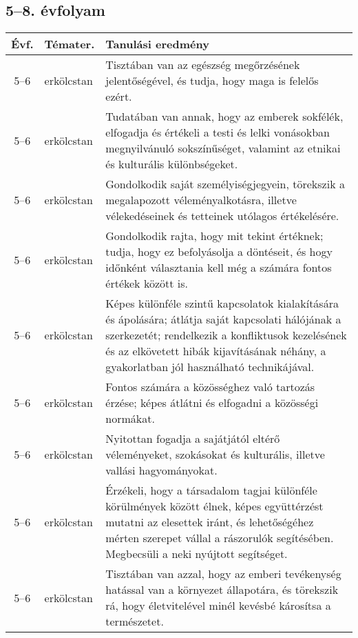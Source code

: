 \subsection{5--8. évfolyam}
\begin{small}
  \begin{longtable}{c | p{2cm} |  p{11cm} }
    \textbf{Évf.} & \textbf{Témater.} & \textbf{Tanulási eredmény} \\ \hline \hline
    \endhead

              5--6 & erkölcstan & Tisztában van az egészség megőrzésének jelentőségével, és tudja, hogy maga is felelős ezért. \\ \hline
              5--6 & erkölcstan & Tudatában van annak, hogy az emberek sokfélék, elfogadja és értékeli a testi és lelki vonásokban megnyilvánuló sokszínűséget, valamint az etnikai és kulturális különbségeket. \\ \hline
              5--6 & erkölcstan & Gondolkodik saját személyiségjegyein, törekszik a megalapozott véleményalkotásra, illetve vélekedéseinek és tetteinek utólagos értékelésére. \\ \hline
              5--6 & erkölcstan & Gondolkodik rajta, hogy mit tekint értéknek; tudja, hogy ez befolyásolja a döntéseit, és hogy időnként választania kell még a számára fontos értékek között is. \\ \hline
              5--6 & erkölcstan & Képes különféle szintű kapcsolatok kialakítására és ápolására; átlátja saját kapcsolati hálójának a szerkezetét; rendelkezik a konfliktusok kezelésének és az elkövetett hibák kijavításának néhány, a gyakorlatban jól használható technikájával. \\ \hline
              5--6 & erkölcstan & Fontos számára a közösséghez való tartozás érzése; képes átlátni és elfogadni a közösségi normákat. \\ \hline
              5--6 & erkölcstan & Nyitottan fogadja a sajátjától eltérő véleményeket, szokásokat és kulturális, illetve vallási hagyományokat. \\ \hline
              5--6 & erkölcstan & Érzékeli, hogy a társadalom tagjai különféle körülmények között élnek, képes együttérzést mutatni az elesettek iránt, és lehetőségéhez mérten szerepet vállal a rászorulók segítésében. Megbecsüli a neki nyújtott segítséget. \\ \hline
              5--6 & erkölcstan & Tisztában van azzal, hogy az emberi tevékenység hatással van a környezet állapotára, és törekszik rá, hogy életvitelével minél kevésbé károsítsa a természetet. \\ \hline

\end{longtable}
\end{small}
